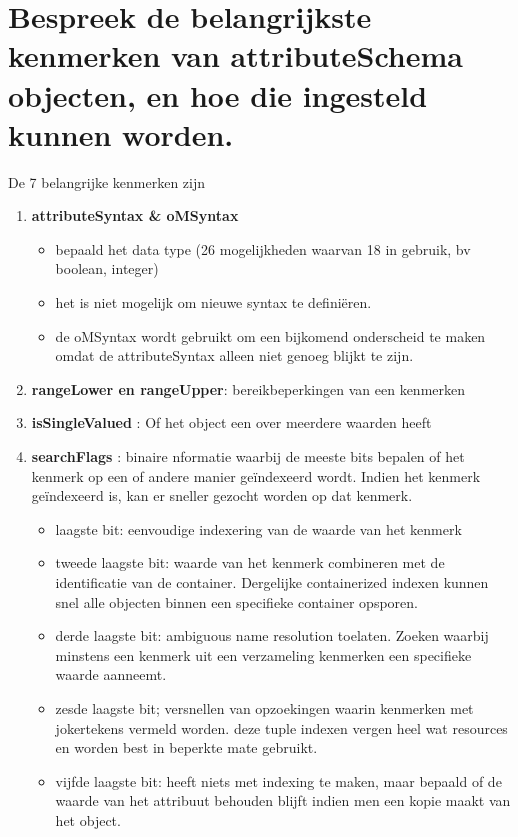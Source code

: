 \section{Bespreek de belangrijkste kenmerken van attributeSchema objecten, en hoe die ingesteld kunnen worden.}
De 7 belangrijke kenmerken zijn
\begin{enumerate}
\item \textbf{attributeSyntax \& oMSyntax}
\begin{itemize}
\item bepaald het data type (26 mogelijkheden waarvan 18 in gebruik, bv boolean, integer)
\item het is niet mogelijk om nieuwe syntax te defini\"eren.
\item de oMSyntax wordt gebruikt om een bijkomend onderscheid te maken omdat de attributeSyntax alleen niet genoeg blijkt te zijn.
\end{itemize}


\item \textbf{rangeLower en rangeUpper}: bereikbeperkingen van een kenmerken

\item \textbf{isSingleValued} : Of het object een over meerdere waarden heeft

\item \textbf{searchFlags} : binaire nformatie waarbij de meeste bits bepalen of het kenmerk op een of andere manier ge\"indexeerd wordt. Indien het kenmerk ge\"indexeerd is, kan er sneller gezocht worden op dat kenmerk.
\begin{itemize}
\item laagste bit: eenvoudige indexering van de waarde van het kenmerk
\item tweede laagste bit: waarde van het kenmerk combineren met de identificatie van de container. Dergelijke containerized indexen kunnen snel alle objecten binnen een specifieke container opsporen.
\item derde laagste bit: ambiguous name resolution toelaten. Zoeken waarbij minstens een kenmerk uit een verzameling kenmerken een specifieke waarde aanneemt.
\item zesde laagste bit; versnellen van opzoekingen waarin kenmerken met jokertekens vermeld worden. deze tuple indexen vergen heel wat resources en worden best in beperkte mate gebruikt.

\item vijfde laagste bit: heeft niets met indexing te maken, maar bepaald of de waarde van het attribuut behouden blijft indien men een kopie maakt van het object.
\end{itemize}


\end{enumerate}
